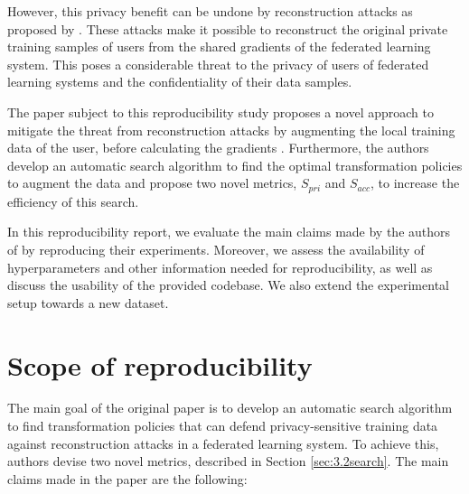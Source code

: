 However, this privacy benefit can be undone by reconstruction attacks as proposed by \cite{geiping2020inverting}\cite{zhao2020idlg}\cite{zhu2019}. These attacks make it possible to reconstruct the original private training samples of users from the shared gradients of the federated learning system. This poses a considerable threat to the privacy of users of federated learning systems and the confidentiality of their data samples.

The paper subject to this reproducibility study proposes a novel approach to mitigate the threat from reconstruction attacks by augmenting the local training data of the user, before calculating the gradients \cite{gao2021privacy}. Furthermore, the authors develop an automatic search algorithm to find the optimal transformation policies to augment the data and propose two novel metrics, $S_{pri}$ and $S_{acc}$, to increase the efficiency of this search.

In this reproducibility report, we evaluate the main claims made by the authors of \cite{gao2021privacy} by reproducing their experiments. Moreover, we assess the availability of hyperparameters and other information needed for reproducibility, as well as discuss the usability of the provided codebase. We also extend the experimental setup towards a new dataset.


\section{Scope of reproducibility}
\label{sec:claims}

The main goal of the original paper is to develop an automatic search algorithm to find transformation policies that can defend privacy-sensitive training data against reconstruction attacks in a federated learning system. To achieve this, authors devise two novel metrics, described in Section \ref{sec:3.2search}. The main claims made in the paper are the following:

